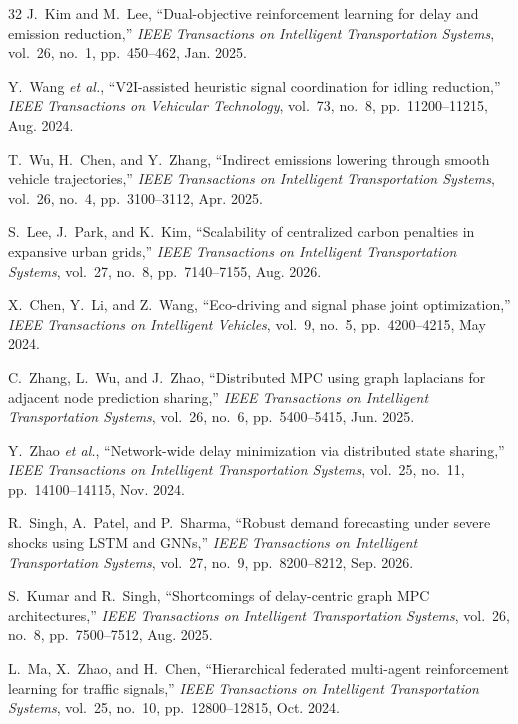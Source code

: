 \documentclass[journal]{IEEEtran}
\begin{document}
\begin{thebibliography}{32}
J.~Kim and M.~Lee, ``Dual-objective reinforcement learning for delay and emission reduction,'' \emph{IEEE Transactions on Intelligent Transportation Systems}, vol.~26, no.~1, pp.~450--462, Jan. 2025.

Y.~Wang \textit{et al.}, ``V2I-assisted heuristic signal coordination for idling reduction,'' \emph{IEEE Transactions on Vehicular Technology}, vol.~73, no.~8, pp.~11200--11215, Aug. 2024.

T.~Wu, H.~Chen, and Y.~Zhang, ``Indirect emissions lowering through smooth vehicle trajectories,'' \emph{IEEE Transactions on Intelligent Transportation Systems}, vol.~26, no.~4, pp.~3100--3112, Apr. 2025.

S.~Lee, J.~Park, and K.~Kim, ``Scalability of centralized carbon penalties in expansive urban grids,'' \emph{IEEE Transactions on Intelligent Transportation Systems}, vol.~27, no.~8, pp.~7140--7155, Aug. 2026.

X.~Chen, Y.~Li, and Z.~Wang, ``Eco-driving and signal phase joint optimization,'' \emph{IEEE Transactions on Intelligent Vehicles}, vol.~9, no.~5, pp.~4200--4215, May 2024.

C.~Zhang, L.~Wu, and J.~Zhao, ``Distributed MPC using graph laplacians for adjacent node prediction sharing,'' \emph{IEEE Transactions on Intelligent Transportation Systems}, vol.~26, no.~6, pp.~5400--5415, Jun. 2025.

Y.~Zhao \textit{et al.}, ``Network-wide delay minimization via distributed state sharing,'' \emph{IEEE Transactions on Intelligent Transportation Systems}, vol.~25, no.~11, pp.~14100--14115, Nov. 2024.

R.~Singh, A.~Patel, and P.~Sharma, ``Robust demand forecasting under severe shocks using LSTM and GNNs,'' \emph{IEEE Transactions on Intelligent Transportation Systems}, vol.~27, no.~9, pp.~8200--8212, Sep. 2026.

S.~Kumar and R.~Singh, ``Shortcomings of delay-centric graph MPC architectures,'' \emph{IEEE Transactions on Intelligent Transportation Systems}, vol.~26, no.~8, pp.~7500--7512, Aug. 2025.

L.~Ma, X.~Zhao, and H.~Chen, ``Hierarchical federated multi-agent reinforcement learning for traffic signals,'' \emph{IEEE Transactions on Intelligent Transportation Systems}, vol.~25, no.~10, pp.~12800--12815, Oct. 2024.


\end{thebibliography}
\end{document}
